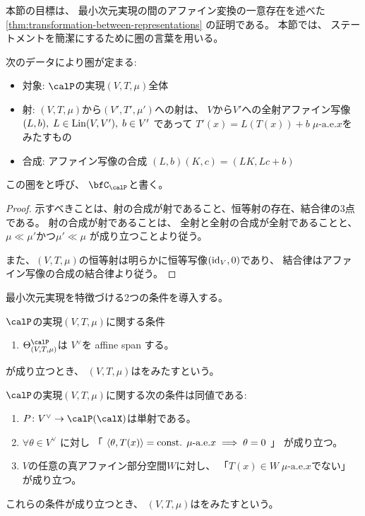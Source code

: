 \documentclass[report]{jlreq}
\begin{document}
本節の目標は、
最小次元実現の間のアファイン変換の一意存在を述べた
\cref{thm:transformation-between-representations}
の証明である。
本節では、
ステートメントを簡潔にするために圏の言葉を用いる。

\begin{propdef}
    次のデータにより圏が定まる:
    \begin{itemize}
        \item 対象: $\calP$の実現$(V, T, \mu)$全体
        \item 射: $(V, T, \mu)$から$(V', T', \mu')$への射は、
            $V$から$V'$への全射アファイン写像
            $(L, b), \; L \in \operatorname{Lin}(V, V'), \; b \in V'$
            であって
            $T'(x) = L(T(x)) + b \; \text{$\mu$-a.e.$x$}$をみたすもの
        \item 合成: アファイン写像の合成
            $(L, b)(K, c) = (LK, Lc + b)$
    \end{itemize}
    この圏をと呼び、
    $\bfC_\calP$と書く。
\end{propdef}

\begin{proof}
    示すべきことは、射の合成が射であること、恒等射の存在、結合律の3点である。
    射の合成が射であることは、
    全射と全射の合成が全射であることと、
    $\mu \ll \mu'$かつ$\mu' \ll \mu$
    が成り立つことより従う。

    また、$(V, T, \mu)$の恒等射は明らかに恒等写像$(\mathrm{id}_V, 0)$であり、
    結合律はアファイン写像の合成の結合律より従う。
\end{proof}

最小次元実現を特徴づける2つの条件を導入する。

\begin{definition}
    $\calP$の実現$(V, T, \mu)$に関する条件
    \begin{enumerate}
        \item $\Theta^\calP_{(V, T, \mu)}$は
            $V^\vee$を affine span する。
    \end{enumerate}
    が成り立つとき、
    $(V, T, \mu)$はをみたすという。
\end{definition}

\begin{propdef}[単射性条件]
    $\calP$の実現$(V, T, \mu)$に関する次の条件は同値である:
    \begin{enumerate}
        \item $P \colon V^\vee \to \calP(\calX)$は単射である。
        \item $\forall \theta \in V^\vee$
            に対し
            「
                $\left\langle{\theta},{T(x)}\right\rangle = \text{const. $\mu$-a.e.$x$}
                \implies
                \theta = 0$
            」
            が成り立つ。
        \item $V$の任意の真アファイン部分空間$W$に対し、
            「$T(x) \in W \; \text{$\mu$-a.e.$x$}$でない」
            が成り立つ。
    \end{enumerate}
    これらの条件が成り立つとき、
    $(V, T, \mu)$はをみたすという。
\end{propdef}
\end{document}

